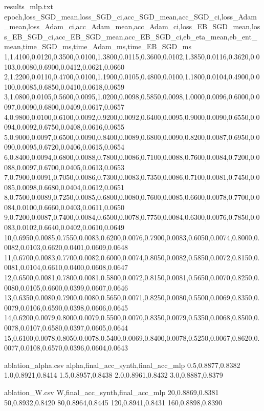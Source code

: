 \begin{filecontents*}{results_mlp.txt}
epoch,loss_SGD_mean,loss_SGD_ci,acc_SGD_mean,acc_SGD_ci,loss_Adam_mean,loss_Adam_ci,acc_Adam_mean,acc_Adam_ci,loss_EB_SGD_mean,loss_EB_SGD_ci,acc_EB_SGD_mean,acc_EB_SGD_ci,eb_eta_mean,eb_ent_mean,time_SGD_ms,time_Adam_ms,time_EB_SGD_ms
1,1.4100,0.0120,0.3500,0.0100,1.3800,0.0115,0.3600,0.0102,1.3850,0.0116,0.3620,0.0103,0.0080,0.6900,0.0412,0.0621,0.0660
2,1.2200,0.0110,0.4700,0.0100,1.1900,0.0105,0.4800,0.0100,1.1800,0.0104,0.4900,0.0100,0.0085,0.6850,0.0410,0.0618,0.0659
3,1.0800,0.0105,0.5600,0.0095,1.0200,0.0098,0.5850,0.0098,1.0000,0.0096,0.6000,0.0097,0.0090,0.6800,0.0409,0.0617,0.0657
4,0.9800,0.0100,0.6100,0.0092,0.9200,0.0092,0.6400,0.0095,0.9000,0.0090,0.6550,0.0094,0.0092,0.6750,0.0408,0.0616,0.0655
5,0.9000,0.0097,0.6500,0.0090,0.8400,0.0089,0.6800,0.0090,0.8200,0.0087,0.6950,0.0090,0.0095,0.6720,0.0406,0.0615,0.0654
6,0.8400,0.0094,0.6800,0.0088,0.7800,0.0086,0.7100,0.0088,0.7600,0.0084,0.7200,0.0088,0.0097,0.6700,0.0405,0.0613,0.0653
7,0.7900,0.0091,0.7050,0.0086,0.7300,0.0083,0.7350,0.0086,0.7100,0.0081,0.7450,0.0085,0.0098,0.6680,0.0404,0.0612,0.0651
8,0.7500,0.0089,0.7250,0.0085,0.6800,0.0080,0.7600,0.0085,0.6600,0.0078,0.7700,0.0084,0.0100,0.6660,0.0403,0.0611,0.0650
9,0.7200,0.0087,0.7400,0.0084,0.6500,0.0078,0.7750,0.0084,0.6300,0.0076,0.7850,0.0083,0.0102,0.6640,0.0402,0.0610,0.0649
10,0.6950,0.0085,0.7550,0.0083,0.6200,0.0076,0.7900,0.0083,0.6050,0.0074,0.8000,0.0082,0.0103,0.6620,0.0401,0.0609,0.0648
11,0.6700,0.0083,0.7700,0.0082,0.6000,0.0074,0.8050,0.0082,0.5850,0.0072,0.8150,0.0081,0.0104,0.6610,0.0400,0.0608,0.0647
12,0.6500,0.0081,0.7800,0.0081,0.5800,0.0072,0.8150,0.0081,0.5650,0.0070,0.8250,0.0080,0.0105,0.6600,0.0399,0.0607,0.0646
13,0.6350,0.0080,0.7900,0.0080,0.5650,0.0071,0.8250,0.0080,0.5500,0.0069,0.8350,0.0079,0.0106,0.6590,0.0398,0.0606,0.0645
14,0.6200,0.0079,0.8000,0.0079,0.5500,0.0070,0.8350,0.0079,0.5350,0.0068,0.8500,0.0078,0.0107,0.6580,0.0397,0.0605,0.0644
15,0.6100,0.0078,0.8050,0.0078,0.5400,0.0069,0.8400,0.0078,0.5250,0.0067,0.8620,0.0077,0.0108,0.6570,0.0396,0.0604,0.0643
\end{filecontents*}

\begin{filecontents*}{ablation_alpha.csv}
alpha,final_acc_synth,final_acc_mlp
0.5,0.8877,0.8382
1.0,0.8921,0.8414
1.5,0.8957,0.8438
2.0,0.8961,0.8432
3.0,0.8887,0.8379
\end{filecontents*}

\begin{filecontents*}{ablation_W.csv}
W,final_acc_synth,final_acc_mlp
20,0.8869,0.8381
50,0.8932,0.8420
80,0.8964,0.8445
120,0.8941,0.8431
160,0.8898,0.8390
\end{filecontents*}

